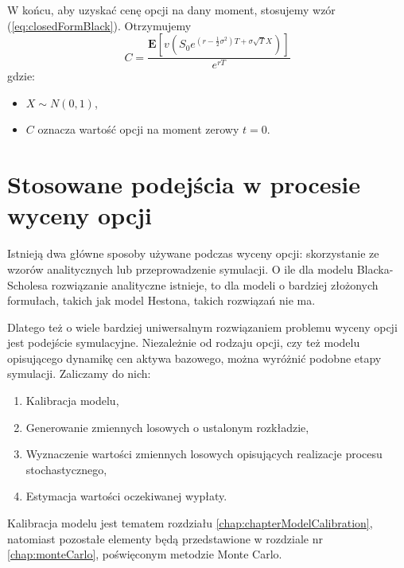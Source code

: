 \documentclass{pracamgr}
\begin{document}
W końcu, aby uzyskać cenę opcji na dany moment, stosujemy wzór (\ref{eq:closedFormBlack}). Otrzymujemy
\begin{equation}
  C = \frac{\mathbf{E}[v(S_0 e^{(r - \frac{1}{2} \sigma^2)T+\sigma \sqrt{T} X})]}{e^{rT}}
\end{equation}
gdzie:
\begin{itemize}
  \item $X \sim N(0,1)$,
  \item $C$ oznacza wartość opcji na moment zerowy $t = 0$.
\end{itemize}




\section{Stosowane podejścia w procesie wyceny opcji} %
\label{sec:}

Istnieją dwa główne sposoby używane podczas wyceny opcji: skorzystanie ze wzorów analitycznych 
lub przeprowadzenie symulacji. O ile dla modelu Blacka-Scholesa rozwiązanie analityczne istnieje, 
to dla modeli o bardziej złożonych formułach, takich jak model Hestona, takich rozwiązań nie ma. 

Dlatego też o wiele bardziej uniwersalnym rozwiązaniem problemu wyceny opcji jest podejście symulacyjne.
Niezależnie od rodzaju opcji, czy też modelu opisującego dynamikę cen aktywa bazowego, można 
wyróżnić podobne etapy symulacji. Zaliczamy do nich:
\begin{enumerate}
  \item Kalibracja modelu,
  \item Generowanie zmiennych losowych o ustalonym rozkładzie,
  \item Wyznaczenie wartości zmiennych losowych opisujących realizacje procesu stochastycznego,
  \item Estymacja wartości oczekiwanej wypłaty.
\end{enumerate}

Kalibracja modelu jest tematem rozdziału \ref{chap:chapterModelCalibration}, natomiast pozostałe 
elementy będą przedstawione w rozdziale nr \ref{chap:monteCarlo}, poświęconym metodzie Monte Carlo.





%
%
\end{document}
